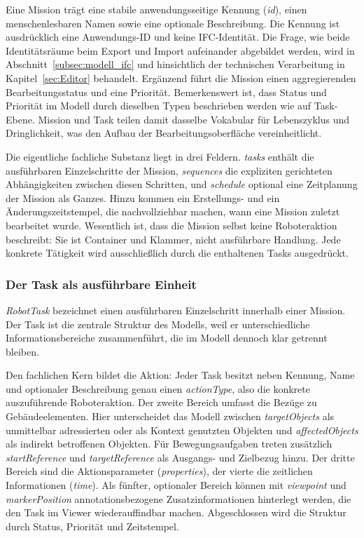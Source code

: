 Eine Mission trägt eine stabile anwendungsseitige Kennung (\textit{id}), einen menschenlesbaren Namen sowie
eine optionale Beschreibung. Die Kennung ist ausdrücklich eine Anwendungs-ID und keine
IFC-Identität. Die Frage, wie beide Identitätsräume beim Export und Import aufeinander abgebildet
werden, wird in Abschnitt~\ref{subsec:modell_ifc} und hinsichtlich der technischen Verarbeitung in
Kapitel~\ref{sec:Editor} behandelt. Ergänzend führt die Mission einen
aggregierenden Bearbeitungsstatus und eine Priorität. Bemerkenswert ist, dass Status und Priorität
im Modell durch dieselben Typen beschrieben werden wie auf Task-Ebene. Mission und Task teilen damit
dasselbe Vokabular für Lebenszyklus und Dringlichkeit, was den Aufbau der Bearbeitungsoberfläche
vereinheitlicht.

Die eigentliche fachliche Substanz liegt in drei Feldern. \textit{tasks} enthält die ausführbaren
Einzelschritte der Mission, \textit{sequences} die expliziten gerichteten Abhängigkeiten zwischen diesen
Schritten, und \textit{schedule} optional eine Zeitplanung der Mission als Ganzes. Hinzu kommen ein
Erstellungs- und ein Änderungszeitstempel, die nachvollziehbar machen, wann eine Mission zuletzt
bearbeitet wurde. Wesentlich ist, dass die Mission selbst keine Roboteraktion beschreibt: Sie ist
Container und Klammer, nicht ausführbare Handlung. Jede konkrete Tätigkeit wird ausschließlich durch
die enthaltenen Tasks ausgedrückt.

\subsubsection{Der Task als ausführbare Einheit}\label{Task_Einheit}
\textit{RobotTask} bezeichnet einen ausführbaren Einzelschritt innerhalb einer Mission. Der Task ist die
zentrale Struktur des Modells, weil er unterschiedliche Informationsbereiche zusammenführt, die im
Modell dennoch klar getrennt bleiben.

Den fachlichen Kern bildet die Aktion: Jeder Task besitzt neben Kennung, Name und optionaler
Beschreibung genau einen \textit{actionType}, also die konkrete auszuführende Roboteraktion. Der zweite
Bereich umfasst die Bezüge zu Gebäudeelementen. Hier unterscheidet das Modell zwischen
\textit{targetObjects} als unmittelbar adressierten oder als Kontext genutzten Objekten und
\textit{affectedObjects} als indirekt betroffenen Objekten. Für Bewegungsaufgaben treten zusätzlich
\textit{startReference} und \textit{targetReference} als Ausgangs- und Zielbezug hinzu. Der dritte Bereich sind
die Aktionsparameter (\textit{properties}), der vierte die zeitlichen Informationen (\textit{time}). Als fünfter,
optionaler Bereich können mit \textit{viewpoint} und \textit{markerPosition} annotationsbezogene
Zusatzinformationen hinterlegt werden, die den Task im Viewer wiederauffindbar machen. Abgeschlossen
wird die Struktur durch Status, Priorität und Zeitstempel.

